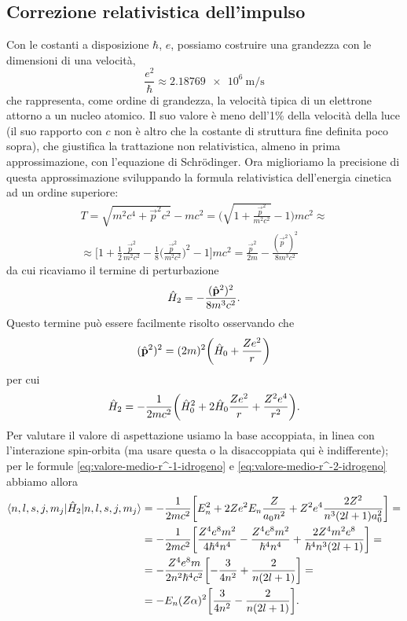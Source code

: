 \subsection{Correzione relativistica dell'impulso}
Con le costanti a disposizione $\hbar$, $e$, possiamo costruire una grandezza con le dimensioni di una velocità,
\begin{equation}
    \frac{e^2}{\hbar}\approx\SI{2.18769e6}{\meter\per\second}
    \label{eq:velocita-tipica-elettrone}
\end{equation}
che rappresenta, come ordine di grandezza, la velocità tipica di un elettrone attorno a un nucleo atomico.
Il suo valore è meno dell'1\% della velocità della luce (il suo rapporto con $c$ non è altro che la costante di struttura fine definita poco sopra), che giustifica la trattazione non relativistica, almeno in prima approssimazione, con l'equazione di Schrödinger.
Ora miglioriamo la precisione di questa approssimazione sviluppando la formula relativistica dell'energia cinetica ad un ordine superiore:
\begin{multline}
    T=
    \sqrt{m^2c^4+\vec{p}^2c^2}-mc^2=
    \biggl(\sqrt{1+\frac{\vec{p}^2}{m^2c^2}}-1\biggr)mc^2\approx\\\approx
    \biggl[1+\frac12\frac{\vec{p}^2}{m^2c^2}-\frac18\biggl(\frac{\vec{p}^2}{m^2c^2}\biggr)^2-1\biggr]mc^2=
    \frac{\vec{p}^2}{2m}-\frac{(\vec{p}^2)^2}{8m^3c^2}
    \label{eq:energia-cinetica-relativistica}
\end{multline}
da cui ricaviamo il termine di perturbazione
\begin{equation}
    \hat{H}_2=-\frac{(\hat{\mathbf{p}}^2)^2}{8m^3c^2}.
    \label{eq:perturbazione-energia-cinetica-relativistica}
\end{equation}
Questo termine può essere facilmente risolto osservando che
\begin{equation}
    (\hat{\mathbf{p}}^2)^2=(2m)^2\biggl(\hat{H}_0+\frac{Ze^2}{r}\biggr)
\end{equation}
per cui
\begin{equation}
    \hat{H}_2=-\frac1{2mc^2}\biggl(\hat{H}_0^2+2\hat{H}_0\frac{Ze^2}{r}+\frac{Z^2e^4}{r^2}\biggr).
\end{equation}
Per valutare il valore di aspettazione usiamo la base accoppiata, in linea con l'interazione spin-orbita (ma usare questa o la disaccoppiata qui è indifferente); per le formule \eqref{eq:valore-medio-r^-1-idrogeno} e \eqref{eq:valore-medio-r^-2-idrogeno} abbiamo allora
\begin{equation}
    \begin{split}
        \langle n,l,s,j,m_j\rvert\hat{H}_2\lvert n,l,s,j,m_j\rangle&=
        -\frac1{2mc^2}\biggl[E_n^2+2Ze^2E_n\frac{Z}{a_0n^2}+Z^2e^4\frac{2Z^2}{n^3(2l+1)a_0^2}\biggr]=\\&=
        -\frac1{2mc^2}\biggl[\frac{Z^4e^8m^2}{4\hbar^4n^4}-\frac{Z^4e^8m^2}{\hbar^4n^4}+\frac{2Z^4m^2e^8}{\hbar^4n^3(2l+1)}\biggr]=\\&=
        -\frac{Z^4e^8m}{2n^2\hbar^4c^2}\biggl[-\frac3{4n^2}+\frac{2}{n(2l+1)}\biggr]=\\&=
        -E_n(Z\alpha)^2\biggl[\frac3{4n^2}-\frac{2}{n(2l+1)}\biggr].
    \end{split}
    \label{eq:correzione-energia-cinetica-relativistica}
\end{equation}
